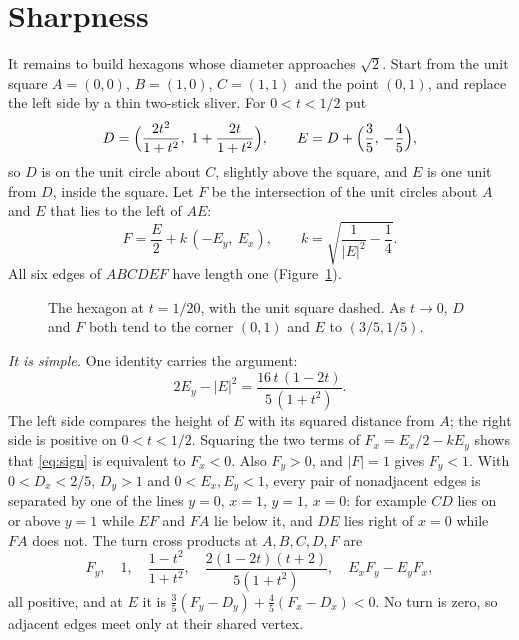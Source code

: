 \documentclass[11pt]{article}
\theoremstyle{remark}
\begin{document}
\section{Sharpness}

It remains to build hexagons whose diameter approaches $\sqrt2$. Start from the unit square
$A=(0,0)$, $B=(1,0)$, $C=(1,1)$ and the point $(0,1)$, and replace the left side by a thin
two-stick sliver. For $0<t<1/2$ put
\[
  D=\Bigl(\frac{2t^2}{1+t^2},\ 1+\frac{2t}{1+t^2}\Bigr),\qquad
  E=D+\Bigl(\frac35,\,-\frac45\Bigr),
\]
so $D$ is on the unit circle about $C$, slightly above the square, and $E$ is one unit
from $D$, inside the square. Let $F$ be the intersection of the unit circles about $A$
and $E$ that lies to the left of $AE$:
\[
  F=\frac{E}{2}+k\,(-E_y,\ E_x),\qquad k=\sqrt{\frac{1}{|E|^2}-\frac14}.
\]
All six edges of $ABCDEF$ have length one (Figure~\ref{fig:sharpness}).

\begin{figure}[ht]
\centering
{}
\caption{The hexagon at $t=1/20$, with the unit square dashed. As $t\to0$, $D$ and $F$
both tend to the corner $(0,1)$ and $E$ to $(3/5,1/5)$.}
\label{fig:sharpness}
\end{figure}

\emph{It is simple.} One identity carries the argument:
\begin{equation}\label{eq:sign}
  2E_y-|E|^2=\frac{16\,t\,(1-2t)}{5\,(1+t^2)} .
\end{equation}
The left side compares the height of $E$ with its squared distance from $A$; the right
side is positive on $0<t<1/2$. Squaring the two terms of $F_x=E_x/2-kE_y$ shows that
\eqref{eq:sign} is equivalent to $F_x<0$. Also $F_y>0$, and $|F|=1$ gives $F_y<1$. With
$0<D_x<2/5$, $D_y>1$ and $0<E_x,E_y<1$, every pair of nonadjacent edges is separated by
one of the lines $y=0$, $x=1$, $y=1$, $x=0$: for example $CD$ lies on or above $y=1$
while $EF$ and $FA$ lie below it, and $DE$ lies right of $x=0$ while $FA$ does not. The
turn cross products at $A,B,C,D,F$ are
\[
  F_y,\quad 1,\quad \frac{1-t^2}{1+t^2},\quad \frac{2(1-2t)(t+2)}{5(1+t^2)},\quad
  E_xF_y-E_yF_x,
\]
all positive, and at $E$ it is $\tfrac35(F_y-D_y)+\tfrac45(F_x-D_x)<0$. No turn is zero, so
adjacent edges meet only at their shared vertex.
\end{document}
